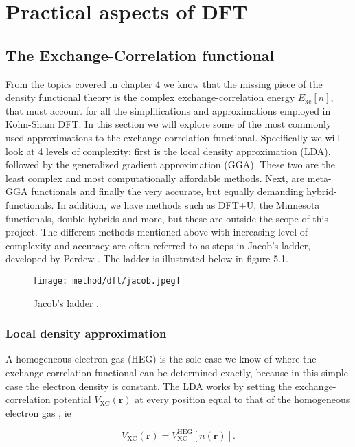 \chapter{Practical aspects of DFT}
\label{sec:Practical DFT}

\section{The Exchange-Correlation functional}
From the topics covered in chapter 4 we know that the missing piece of the density functional theory is the complex exchange-correlation energy $E_{\text{xc}}[n]$, that must account for all the simplifications and approximations employed in Kohn-Sham DFT. In this section we will explore some of the most commonly used approximations to the exchange-correlation functional. Specifically we will look at 4 levels of complexity: first is the local density approximation (LDA), followed by the generalized gradient approximation (GGA). These two are the least complex and most computationally affordable methods. Next, are meta-GGA functionals and finally the very accurate, but equally demanding hybrid-functionals. In addition, we have methods such as DFT+U, the Minnesota functionals, double hybrids and more, but these are outside the scope of this project. The different methods mentioned above with increasing level of complexity and accuracy are often referred to as steps in Jacob's ladder, developed by Perdew \cite{jacob}. The ladder is illustrated below in figure 5.1. 

\begin{figure}[H]
\centering
\texttt{[image: method/dft/jacob.jpeg]}
\caption{Jacob's ladder \cite{jacob}.}
\end{figure}

\subsection{Local density approximation}
A homogeneous electron gas (HEG) is the sole case we know of where the exchange-correlation functional can be determined exactly, because in this simple case the electron density is constant. The LDA works by setting the exchange-correlation potential $V_\text{XC}(\boldsymbol{r})$ at every position equal to that of the homogeneous electron gas \cite{persson2020}, ie

\begin{equation}
V_\text{XC}(\boldsymbol{r}) = V_\text{XC} ^\text{HEG}[n(\boldsymbol{r})] .
\end{equation} 


